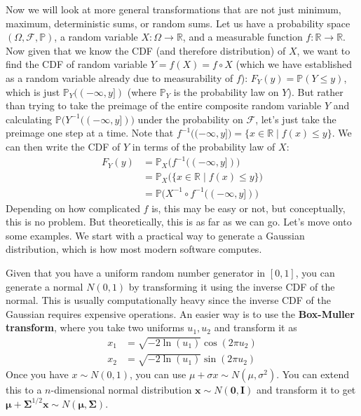     Now we will look at more general transformations that are not just minimum, maximum, deterministic sums, or random sums. Let us have a probability space $(\Omega, \mathcal{F}, \mathbb{P})$, a random variable $X: \Omega \rightarrow \mathbb{R}$, and a measurable function $f: \mathbb{R} \rightarrow \mathbb{R}$. Now given that we know the CDF (and therefore distribution) of $X$, we want to find the CDF of random variable $Y = f(X) = f \circ X$ (which we have established as a random variable already due to measurability of $f$): $F_Y (y) = \mathbb{P}(Y \leq y)$, which is just $\mathbb{P}_Y ((-\infty, y])$ (where $\mathbb{P}_Y$ is the probability law on $Y$). But rather than trying to take the preimage of the entire composite random variable $Y$ and calculating $\mathbb{P}\big( Y^{-1}((-\infty, y]) \big)$ under the probability on $\mathcal{F}$, let's just take the preimage one step at a time. Note that $f^{-1} \big( (-\infty, y] \big) = \{x \in \mathbb{R} \mid f(x) \leq y\}$. We can then write the CDF of $Y$ in terms of the probability law of $X$: 
    \begin{align*}
      F_Y (y) & = \mathbb{P}_X \big( f^{-1} ((-\infty, y]) \big) \\
      & = \mathbb{P}_X \big( \{x \in \mathbb{R} \mid f(x) \leq y\} \big) \\
      & = \mathbb{P} \big( X^{-1} \circ f^{-1} ((-\infty, y]) \big) 
    \end{align*}
    Depending on how complicated $f$ is, this may be easy or not, but conceptually, this is no problem. But theoretically, this is as far as we can go. Let's move onto some examples. We start with a practical way to generate a Gaussian distribution, which is how most modern software computes. 

    \begin{example}
      Given that you have a uniform random number generator in $[0, 1]$, you can generate a normal $N(0, 1)$ by transforming it using the inverse CDF of the normal. This is usually computationally heavy since the inverse CDF of the Gaussian requires expensive operations. An easier way is to use the \textbf{Box-Muller transform}, where you take two uniforms $u_1, u_2$ and transform it as 
      \begin{align*}
          x_1 & = \sqrt{-2 \ln(u_1)} \cos(2 \pi u_2) \\
          x_2 & = \sqrt{-2 \ln(u_1)} \sin(2 \pi u_2)
      \end{align*}
      Once you have $x \sim N(0, 1)$, you can use $\mu + \sigma x \sim N(\mu, \sigma^2)$. You can extend this to a $n$-dimensional normal distribution $\mathbf{x} \sim N(\mathbf{0}, \mathbf{I})$ and transform it to get $\boldsymbol{\mu} + \boldsymbol{\Sigma}^{1/2} \mathbf{x} \sim N(\boldsymbol{\mu}, \boldsymbol{\Sigma})$. 
    \end{example}

